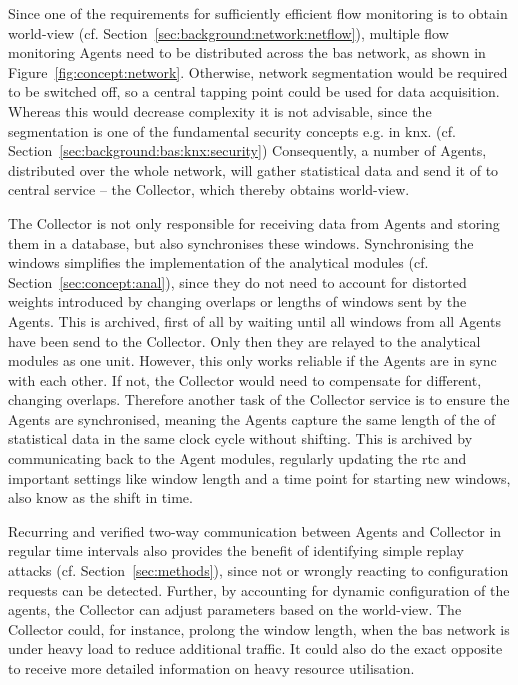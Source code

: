 Since one of the requirements for sufficiently efficient flow monitoring is to obtain world-view (cf. Section~\ref{sec:background:network:netflow}), multiple flow monitoring Agents need to be distributed across the \gls{bas} network, as shown in Figure~\ref{fig:concept:network}. Otherwise, network segmentation would be required to be switched off, so a central tapping point could be used for data acquisition.
Whereas this would decrease complexity it is not advisable, since the segmentation is one of the fundamental security concepts e.g. in \gls{knx}. (cf. Section~\ref{sec:background:bas:knx:security})
Consequently, a number of Agents, distributed over the whole network, will gather statistical data and send it of to central service -- the Collector, which thereby obtains world-view.

The Collector is not only responsible for receiving data from Agents and storing them in a database, but also synchronises these windows. Synchronising the windows simplifies the implementation of the analytical modules (cf. Section~\ref{sec:concept:anal}), since they do not need to account for distorted weights introduced by changing overlaps or lengths of windows sent by the Agents.
This is archived, first of all by waiting until all windows from all Agents have been send to the Collector. Only then they are relayed to the analytical modules as one unit.
However, this only works reliable if the Agents are in sync with each other. If not, the Collector would need to compensate for different, changing overlaps. Therefore another task of the Collector service is to ensure the Agents are synchronised, meaning the Agents capture the same length of the of statistical data in the same clock cycle without shifting.
This is archived by communicating back to the Agent modules, regularly updating the \gls{rtc} and important settings like window length and a time point for starting new windows, also know as the shift in time.

Recurring and verified two-way communication between Agents and Collector in regular time intervals also provides the benefit of identifying simple replay attacks (cf. Section~\ref{sec:methods}), since not or wrongly reacting to configuration requests can be detected.
Further, by accounting for dynamic configuration of the agents, the Collector can adjust parameters based on the world-view.
The Collector could, for instance, prolong the window length, when the \gls{bas} network is under heavy load to reduce additional traffic. It could also do the exact opposite to receive more detailed information on heavy resource utilisation.

